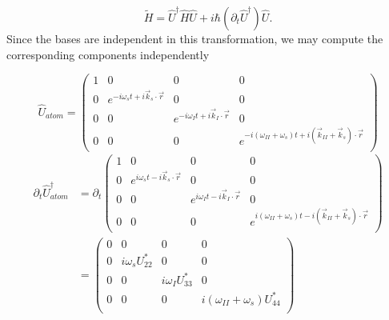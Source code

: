 \documentclass[aps,pra,showpacs,amsmath,amssymb,nofootinbib,longbibliography,superscriptaddress
]{revtex4-1}
\theoremstyle{definition}
\theoremstyle{remark}
\newcommand{\0}{\hat{0}}
\begin{document}
\begin{equation}
    \tilde{H} = \hat{U}^{\dagger} \hat{H} \hat{U} + i \hbar (\partial_t \hat{U}^{\dagger}) \hat{U}.
\end{equation}
Since the bases are independent in this transformation, we may compute the corresponding components independently

\begin{equation}
    \hat{U}_{atom} = \left(\begin{array}{cccc}
        1 & 0 & 0 & 0\\
        0 & e^{-i \omega_s t + i \vec{k}_s \cdot \vec{r}} & 0 & 0\\
        0 & 0 & e^{-i \omega_I t + i \vec{k}_I \cdot \vec{r}} & 0\\
        0 & 0 & 0 & e^{-i(\omega_{II} + \omega_s) t + i(\vec{k}_{II} + \vec{k}_s) \cdot \vec{r}}\\
    \end{array}\right)
\end{equation}
\begin{align}
    \partial_t \hat{U}_{atom}^{\dagger}
    &=
    \partial_t \left(\begin{array}{cccc}
        1 & 0 & 0 & 0\\
        0 & e^{i \omega_s t - i \vec{k}_s \cdot \vec{r}} & 0 & 0\\
        0 & 0 & e^{i \omega_I t - i \vec{k}_I \cdot \vec{r}} & 0\\
        0 & 0 & 0 & e^{i(\omega_{II} + \omega_s) t - i(\vec{k}_{II} + \vec{k}_s) \cdot \vec{r}}\\
    \end{array}\right) \nonumber \\
    &=
    \left(\begin{array}{cccc}
        0 & 0 & 0 & 0\\
        0 & i \omega_s U_{22}^{*} & 0 & 0\\
        0 & 0 & i \omega_I U_{33}^{*} & 0\\
        0 & 0 & 0 & i(\omega_{II} + \omega_s)U_{44}^{*}\\
    \end{array}\right)
\end{align}
\end{document}

